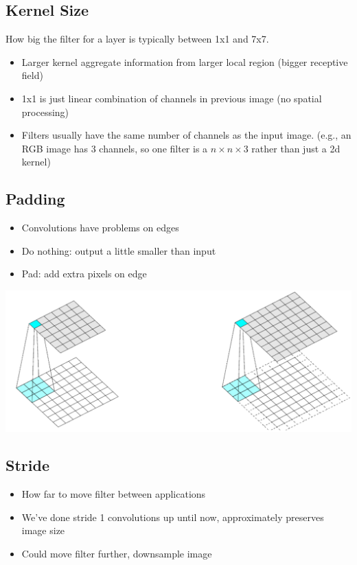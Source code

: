 \documentclass[10pt]{article}
\begin{document}
\subsection*{Kernel Size}
How big the filter for a layer is typically between 1x1 and 7x7.
\begin{itemize}
	\item Larger kernel aggregate information from larger local region (bigger receptive field)
	\item 1x1 is just linear combination of channels in previous image (no spatial processing)
	\item Filters usually have the same number of channels as the input image. (e.g., an RGB image has 3 channels, so one filter is a $n \times n \times 3$ rather than just a 2d kernel)
\end{itemize}

\subsection*{Padding}
\begin{itemize}
	\item Convolutions have problems on edges
    \item Do nothing: output a little smaller than input
    \item Pad: add extra pixels on edge
\end{itemize}
\begin{center} 
	\includegraphics*[width=\textwidth]{L2_19.png} 
\end{center}

\subsection*{Stride}
\begin{itemize}
	\item How far to move filter between applications
	\item We've done stride 1 convolutions up until now, approximately preserves image size
	\item Could move filter further, downsample image
\end{itemize}
\end{document}

